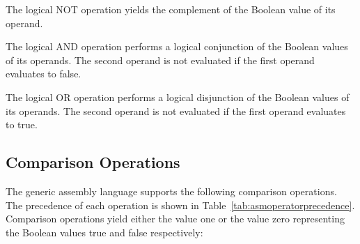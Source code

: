 \begin{itemize}


The logical NOT operation yields the complement of the Boolean value of its operand.


The logical AND operation performs a logical conjunction of the Boolean values of its operands.
The second operand is not evaluated if the first operand evaluates to false.


The logical OR operation performs a logical disjunction of the Boolean values of its operands.
The second operand is not evaluated if the first operand evaluates to true.

\end{itemize}

\subsection{Comparison Operations}

The generic assembly language supports the following comparison operations.
The precedence of each operation is shown in Table~\ref{tab:asmoperatorprecedence}.
Comparison operations yield either the value one or the value zero representing the Boolean values true and false respectively:

